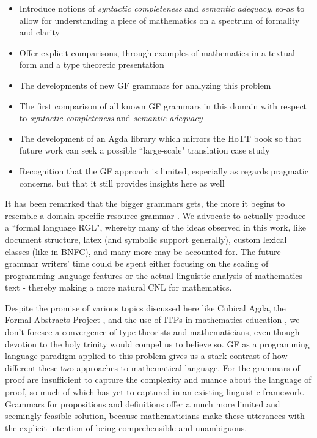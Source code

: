 \begin{itemize}
\item Introduce notions of \emph{syntactic completeness} and \emph{semantic adequacy}, so-as to
allow for understanding a piece of mathematics on a spectrum of formality and
clarity
\item Offer explicit comparisons, through examples of mathematics in a textual form and a type
  theoretic presentation
\item The developments of new GF grammars for analyzing this problem
\item The first comparison of all known GF grammars in this domain with respect
  to \emph{syntactic completeness} and \emph{semantic adequacy}
\item The development of an Agda library which mirrors the HoTT book so that
  future work can seek a possible ``large-scale" translation case study
\item Recognition that the GF approach is limited, especially as regards pragmatic
  concerns, but that it still provides insights here as well
\end{itemize}

It has been remarked that the bigger grammars gets, the more it begins to
resemble a domain specific resource grammar \cite{angelovSS}. We advocate to
actually produce a ``formal language RGL", whereby many of the ideas observed in
this work, like document structure, latex (and symbolic support generally),
custom lexical classes (like in BNFC), and many more may be accounted for.
The future grammar writers' time could be spent either focusing on
the scaling of programming language features or the actual linguistic analysis
of mathematics text - thereby making a more natural CNL for mathematics.

Despite the promise of various topics discussed here like Cubical Agda, the
Formal Abstracts Project , and the use of ITPs in mathematics education
\cite{buzzard2020will}, we don't foresee a convergence of type theorists and
mathematicians, even though devotion to the holy trinity would compel us to
believe so. GF as a programming language paradigm applied to this problem gives
us a stark contrast of how different these two approaches to mathematical
language. For the grammars of proof are insufficient to capture the complexity
and nuance about the language of proof, so much of which has yet to captured in
an existing linguistic framework. Grammars for propositions and definitions
offer a much more limited and seemingly feasible solution, because
mathematicians make these utterances with the explicit intention of
being comprehensible and unambiguous.


